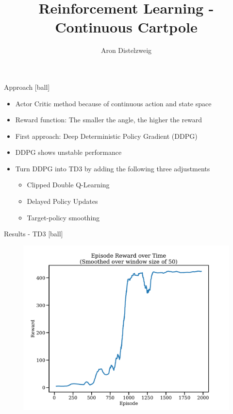 \documentclass[10pt]{beamer}
\title{Reinforcement Learning - Continuous Cartpole}
\date{}
\author{Aron Distelzweig}
\institute{Project}
\begin{document}
\maketitle

\begin{frame}[fragile]{Approach}
[ball]
\begin{itemize}
  \item Actor Critic method because of continuous action and state space
  \item Reward function: The smaller the angle, the higher the reward
  \item First approach: Deep Deterministic Policy Gradient (DDPG)
  \item DDPG shows unstable performance
  \item Turn DDPG into TD3 by adding the following three adjustments
  \begin{itemize}
  \item Clipped Double Q-Learning
  \item Delayed Policy Updates
  \item Target-policy smoothing
  \end{itemize}
\end{itemize}
\end{frame}

\begin{frame}[fragile]{Results - TD3}
[ball]
  \begin{figure}
   \includegraphics[scale=0.3]{../results/td3_res_episode_reward.pdf}
  \end{figure}
\end{frame}
\end{document}

